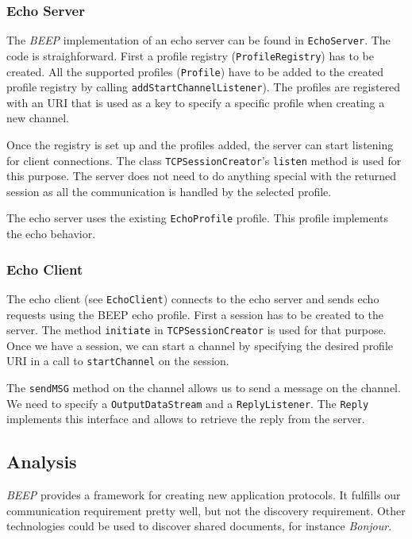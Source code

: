 \subsubsection{Echo Server}
The \emph{BEEP} implementation of an echo server can be found in \texttt{EchoServer}. The code is straighforward. First a profile registry (\texttt{ProfileRegistry}) has to be created. All the supported profiles (\texttt{Profile}) have to be added to the created profile registry by calling \texttt{addStartChannelListener}). The profiles are registered with an URI that is used as a key to specify a specific profile when creating a new channel.

Once the registry is set up and the profiles added, the server can start listening for client connections. The class \texttt{TCPSessionCreator}'s \texttt{listen} method is used for this purpose. The server does not need to do anything special with the returned session as all the communication is handled by the selected profile.

The echo server uses the existing \texttt{EchoProfile} profile. This profile implements the echo behavior.

\subsubsection{Echo Client}
The echo client (see \texttt{EchoClient}) connects to the echo server and sends echo requests using the BEEP echo profile. First a session has to be created to the server. The method \texttt{initiate} in \texttt{TCPSessionCreator} is used for that purpose. Once we have a session, we can start a channel by specifying the desired profile URI in a call to \texttt{startChannel} on the session.

The \texttt{sendMSG} method on the channel allows us to send a message on the channel. We need to specify a \texttt{OutputDataStream} and a \texttt{ReplyListener}. The \texttt{Reply} implements this interface and allows to retrieve the reply from the server.



\subsection{Analysis}
\emph{BEEP} provides a framework for creating new application protocols. It fulfills our communication requirement pretty well, but not the discovery requirement. Other technologies could be used to discover shared documents, for instance \emph{Bonjour}.

